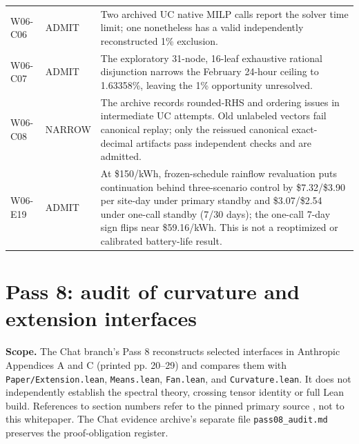 \documentclass[11pt,letterpaper]{article}
\begin{document}
\begin{longtable}{P{.12\linewidth}P{.12\linewidth}P{.66\linewidth}}
W06-C06 & ADMIT & Two archived UC native MILP calls report the solver time limit; one nonetheless has a valid independently reconstructed 1\% exclusion.\\
W06-C07 & ADMIT & The exploratory 31-node, 16-leaf exhaustive rational disjunction narrows the February 24-hour ceiling to 1.63358\%, leaving the 1\% opportunity unresolved.\\
W06-C08 & NARROW & The archive records rounded-RHS and ordering issues in intermediate UC attempts. Old unlabeled vectors fail canonical replay; only the reissued canonical exact-decimal artifacts pass independent checks and are admitted.\\
W06-E19 & ADMIT & At \$150/kWh, frozen-schedule rainflow revaluation puts continuation behind three-scenario control by \$7.32/\$3.90 per site-day under primary standby and \$3.07/\$2.54 under one-call standby (7/30 days); the one-call 7-day sign flips near \$59.16/kWh. This is not a reoptimized or calibrated battery-life result.\\
\bottomrule
\end{longtable}
\endgroup

\section{Pass 8: audit of curvature and extension interfaces}
\label{sec:pass08}
\textbf{Scope.} The Chat branch's Pass 8 reconstructs selected interfaces in Anthropic Appendices A and C (printed pp. 20--29) and compares them with \texttt{Paper/Extension.lean}, \texttt{Means.lean}, \texttt{Fan.lean}, and \texttt{Curvature.lean}. It does not independently establish the spectral theory, crossing tensor identity or full Lean build. References to section numbers refer to the pinned primary source \cite{anthropic}, not to this whitepaper. The Chat evidence archive's separate file \texttt{pass08\_audit.md} preserves the proof-obligation register.
\end{document}
